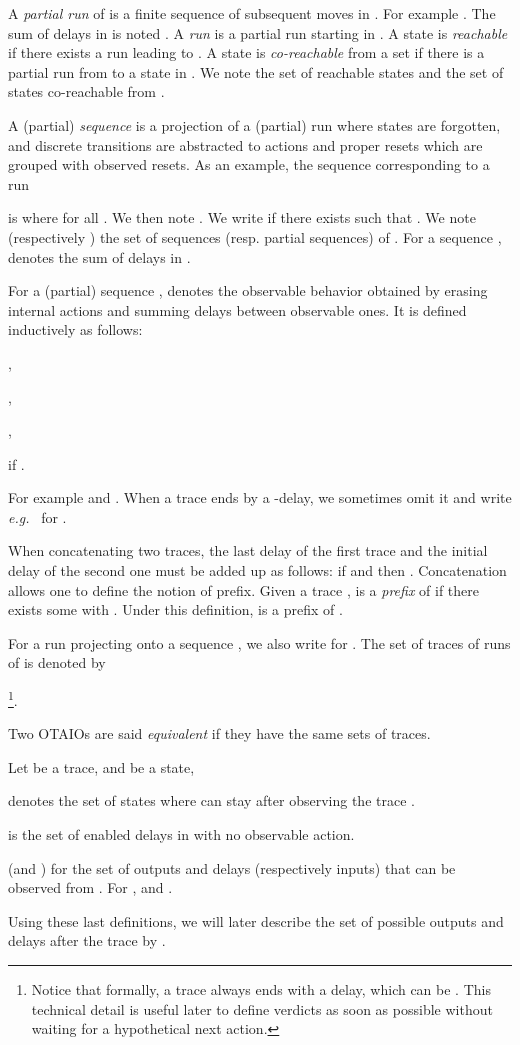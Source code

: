 \documentclass{LMCS}
\theoremstyle{plain}\newtheorem{proposition}[thm]{Proposition}
\def\eg{{\em e.g.}}
\begin{document}
A  {\it partial run} of  is a finite sequence of subsequent moves
in .
For example 
. 
The sum of 
delays in  is noted  . 
A {\em run} is a partial run starting in .
A state  is {\em reachable} if there exists a run leading to . 
A  state  is {\em co-reachable} from a set  if there is 
a partial run from   to a state in .
We note  the set of reachable states and 
 the set of states co-reachable  from .

A (partial) {\em sequence} is a projection of a (partial) run where
states are forgotten, and discrete transitions are abstracted to
actions and proper resets which are grouped with observed resets.  
As an example, the
sequence corresponding to a run 

 is  where 
 for all .  We then note .  We write  
if there exists
 such that  .  We note 
(respectively ) the set of sequences (resp. partial
sequences) of . For a sequence , 
denotes the sum of delays in .

For a (partial) sequence , 
 denotes the observable behavior obtained by erasing internal actions
and summing delays between observable ones. It is defined inductively as follows:
\begin{iteMize}{}
\item 
,
\item
,
\item 
,
\item 
 if .
\end{iteMize}
For example  and
.  When a trace ends by a
-delay, we sometimes omit it and write \eg~ for .

When concatenating two traces, the last delay of the first trace and
the initial delay of the second one must be added up as follows: if
 and
 then
.  Concatenation allows one to define the notion of prefix. Given a
  trace ,  is a \emph{prefix} of  if there
  exists some  with . Under
  this definition,  is a prefix of .

For a run  projecting onto a sequence , 
we also write  for .  
The set of traces of runs of  is denoted by

\footnote{Notice that formally, a trace always ends with a delay, which can be .
This technical detail is useful later to define verdicts as soon as possible 
without waiting for a hypothetical next action.
}. 



 Two OTAIOs are said
\emph{equivalent} if they have the same sets of traces.

Let  be a trace, 
and  be a state, 
\begin{iteMize}{}
\item 
 denotes the set of
states where  can stay after observing the trace .
\item
 is the set of
enabled delays in  with no  observable action.
\item   (and ) for the set of
outputs and delays (respectively inputs) that can be observed from
.  
For , 
and .
\end{iteMize}
Using these last definitions, 
we will later describe 
the set of 
possible outputs and delays after the trace 
by  .
\end{document}
